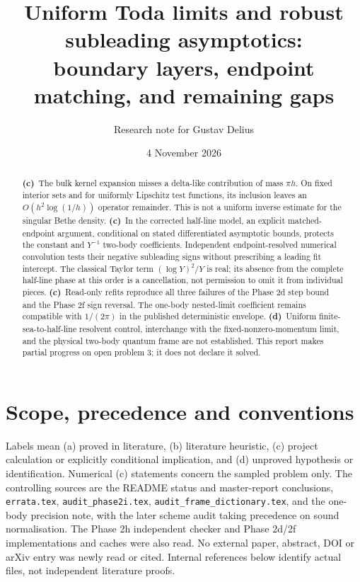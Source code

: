 \documentclass[11pt,a4paper]{article}
\title{Uniform Toda limits and robust subleading asymptotics:\\boundary layers, endpoint matching, and remaining gaps}
\author{Research note for Gustav Delius}
\date{4 November 2026}
\newcommand{\C}{\textbf{(c)}\ }
\newcommand{\D}{\textbf{(d)}\ }
\newcommand{\file}[1]{\nolinkurl{#1}}
\begin{document}
\maketitle
\begin{abstract}
\C The bulk kernel expansion misses a delta-like contribution of mass
$\pi h$. On fixed interior sets and for uniformly Lipschitz test functions,
its inclusion leaves an $O(h^2\log(1/h))$ operator remainder. This is not a
uniform inverse estimate for the singular Bethe density.
\C In the corrected half-line model, an explicit matched-endpoint argument,
conditional on stated differentiated asymptotic bounds, protects the constant
and $Y^{-1}$ two-body coefficients. Independent endpoint-resolved numerical
convolution tests their negative subleading signs without prescribing a leading
fit intercept. The classical Taylor term $(\log Y)^2/Y$ is real; its absence
from the complete half-line phase at this order is a cancellation, not permission
to omit it from individual pieces.
\C Read-only refits reproduce all three failures of the Phase 2d step bound
and the Phase 2f sign reversal. The one-body nested-limit coefficient remains
compatible with $1/(2\pi)$ in the published deterministic envelope.
\D Uniform finite-sea-to-half-line resolvent control, interchange with the
fixed-nonzero-momentum limit, and the physical two-body quantum frame are
not established. This report makes partial progress on open problem 3; it does
not declare it solved.
\end{abstract}

\section{Scope, precedence and conventions}
Labels mean (a) proved in literature, (b) literature heuristic, (c) project
calculation or explicitly conditional implication, and (d) unproved hypothesis
or identification. Numerical (c) statements concern the sampled problem only.
The controlling sources are the README status and master-report conclusions,
\file{errata.tex}, \file{audit_phase2i.tex}, \file{audit_frame_dictionary.tex},
and the one-body precision note, with the later scheme audit taking precedence
on sound normalisation. The Phase 2h independent checker and Phase 2d/2f
implementations and caches were also read. No external paper, abstract,
DOI or arXiv entry was newly read or cited. Internal references below identify
actual files, not independent literature proofs.
\end{document}

